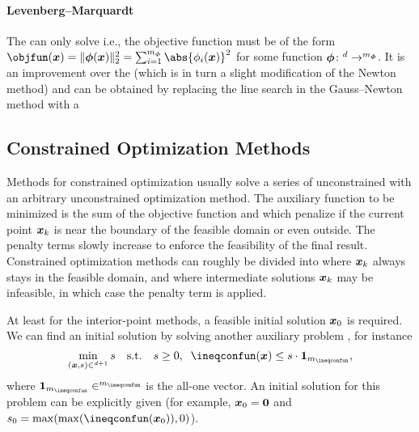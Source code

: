 \paragraph{Levenberg--Marquardt}

The 
can only solve  i.e.,
the objective function must be of the form
$
  \objfun(\*x)
  = \norm[2]{\*\phi(\*x)}^2
  = \sum_{i=1}^{m_{\*\phi}} \abs{\phi_i(\*x)}^2
$
for some function $\*\phi\colon \real^d \to \real^{m_{\*\phi}}$.
It is an improvement over the 
(which is in turn a slight modification of the Newton method)
and can be obtained by replacing the line search in the
Gauss--Newton method with a 



\subsection{Constrained Optimization Methods}
\label{sec:513gradientBasedConstrained}

Methods for constrained optimization usually
solve a series of unconstrained  with an arbitrary
unconstrained optimization method.
The auxiliary function to be minimized is
the sum of the objective function and 
which penalize if the current point ${\boldsymbol{x}}_k$ is near the boundary
of the feasible domain or even outside.
The penalty terms slowly increase to enforce
the feasibility of the final result.
Constrained optimization methods can roughly be divided
into 
where ${\boldsymbol{x}}_k$ always stays in the feasible domain,
and 
where intermediate solutions ${\boldsymbol{x}}_k$ may be infeasible,
in which case the penalty term is applied.

At least for the interior-point methods,
a feasible initial solution ${\boldsymbol{x}}_0$ is required.
We can find an initial solution by solving another auxiliary problem
\cite{Toussaint15Introduction}, for instance
\begin{equation}
  \min_{(\*x, s) \in \real^{d+1}} s
  \quad\text{s.t.}\quad
  s \ge 0,\;\;
  \ineqconfun(\*x) \le s \cdot \*1_{m_{\ineqconfun}},
\end{equation}
where $\*1_{m_{\ineqconfun}} \in \real^{m_{\ineqconfun}}$
is the all-one vector.
An initial solution for this problem can be explicitly given
(for example, ${\boldsymbol{x}}_0 = {\boldsymbol{0}}$ and
$s_0 = \max(\max(\ineqconfun(\*x_0)), 0)$).

